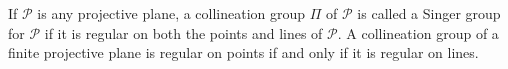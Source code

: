 If $\mathcal{P}$ is any projective plane, a collineation group $\Pi$ of $\mathcal{P}$ is called a Singer group for $\mathcal{P}$ if it is regular on both the points and lines of $\mathcal{P}$. A collineation group of a finite projective plane is regular on points if and only if it is regular on lines.

